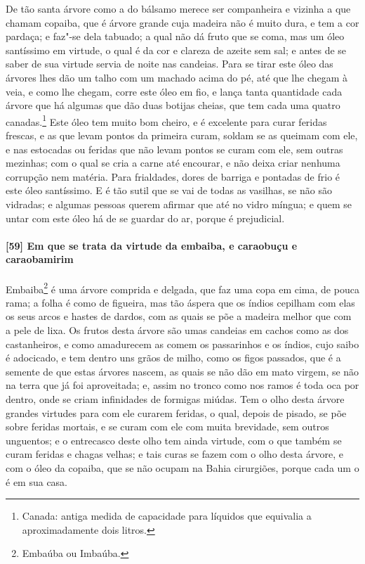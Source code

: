 De tão santa árvore como a do bálsamo merece ser companheira e vizinha a que chamam
copaiba, que é árvore grande cuja madeira não é muito dura, e tem a cor pardaça; e faz"-se
dela tabuado; a qual não dá fruto que se coma, mas um óleo
santíssimo em virtude, o qual é da cor e clareza de azeite sem sal; e antes de se saber de
sua virtude servia de 
noite nas candeias. Para se tirar este óleo das árvores lhes dão um talho com um machado
acima do pé, até que lhe chegam à veia, e como lhe chegam, corre este óleo em fio, e lança
tanta quantidade cada árvore que há algumas que dão duas botijas cheias, que tem cada uma
quatro canadas.\footnote{ Canada: antiga medida de capacidade para líquidos que equivalia
a aproximadamente dois litros.} Este óleo tem muito bom cheiro, e é excelente para curar
feridas frescas, e as que levam pontos da primeira curam, soldam se as queimam com ele, e
nas estocadas ou feridas que não levam pontos se curam com ele, sem outras mezinhas; com o
qual se cria a carne até encourar, e não deixa criar nenhuma corrupção nem matéria. Para
frialdades, dores de barriga e pontadas de frio é este óleo santíssimo. E é tão sutil que
se vai de todas as vasilhas, se não são vidradas; e algumas pessoas querem afirmar que até
no vidro míngua; e quem se untar com este óleo há de se guardar do ar, porque é
prejudicial.

\paragraph{[59] Em que se trata da virtude da embaiba, e caraobuçu e caraobamirim}\quad
Embaiba\footnote{ Embaúba ou Imbaúba.} é uma árvore comprida e delgada, que faz uma copa
em cima, de pouca rama; a folha é como de figueira, mas tão áspera que os índios cepilham
com elas os seus arcos e hastes de dardos, com as quais se põe a madeira melhor que com a
pele de lixa. Os frutos desta árvore são umas candeias em cachos como as dos castanheiros,
e como amadurecem as comem os passarinhos e os índios, cujo saibo é adocicado, e tem
dentro uns grãos de milho, como os figos passados, que é a semente de que estas árvores
nascem, as quais se não dão em mato virgem, se não na terra que já foi aproveitada; e,
assim no tronco como nos ramos é toda oca por dentro, onde se criam infinidades de
formigas miúdas. Tem o olho desta árvore grandes virtudes para com ele curarem feridas, o
qual, depois de pisado, se põe sobre feridas mortais, e se curam com ele com muita
brevidade, sem outros unguentos; e o entrecasco deste olho tem ainda virtude, com o que
também se curam feridas e chagas velhas; e tais curas se fazem com o olho desta árvore, e
com o óleo da copaiba, que se não ocupam na Bahia cirurgiões, porque cada um o é em sua
casa.

